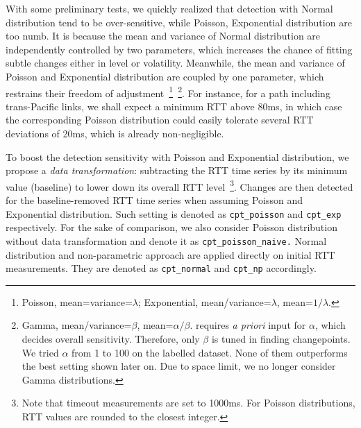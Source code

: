 With some preliminary tests, we quickly realized that detection with Normal distribution tend to be over-sensitive, while Poisson, Exponential distribution are too numb.
It is because the mean and variance of Normal distribution are independently controlled by two parameters, which increases the chance of fitting subtle changes either in level or volatility.
Meanwhile, the mean and variance of Poisson and Exponential distribution are coupled by one parameter,
which restrains their freedom of adjustment~\footnote{Poisson, mean=variance=$\lambda$; Exponential, mean/variance=$\lambda$, mean=$1/\lambda$.}~\footnote{Gamma, mean/variance=$\beta$, mean=$\alpha/\beta$. \cite{Killick2013a} requires \textit{a priori} input for $\alpha$, which decides overall sensitivity. Therefore, only $\beta$ is tuned in finding changepoints.
We tried $\alpha$ from 1 to 100 on the labelled dataset. None of them outperforms the best setting shown later on. Due to space limit, we no longer consider Gamma distributions.}.
For instance, for a path including trans-Pacific links, we shall expect a minimum RTT above 80ms, in which case the corresponding Poisson distribution could easily tolerate several RTT deviations of 20ms, which is already non-negligible.


To boost the detection sensitivity with Poisson and Exponential distribution, we propose a \textit{data transformation}: subtracting the RTT time series by its minimum value (baseline) to lower down its overall RTT level~\footnote{Note that timeout measurements are set to 1000ms. For Poisson distributions, RTT values are rounded to the closest integer.}. 
Changes are then detected for the baseline-removed RTT time series when assuming Poisson and Exponential distribution.
Such setting is denoted as \texttt{cpt\_poisson} and \texttt{cpt\_exp} respectively.
For the sake of comparison, we also consider Poisson distribution without data transformation and denote it as \texttt{cpt\_poisson\_naive.}
Normal distribution and non-parametric approach are applied directly on initial RTT measurements.
They are denoted as \texttt{cpt\_normal} and \texttt{cpt\_np} accordingly.

